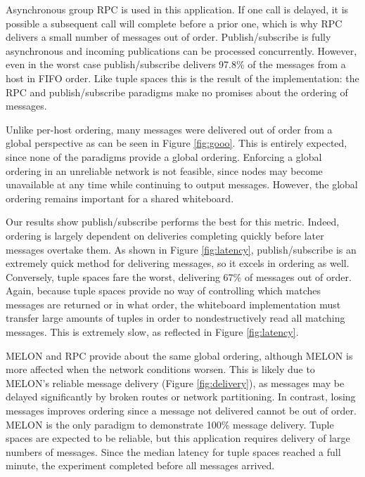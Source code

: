 \documentclass{llncs}
\begin{document}
Asynchronous group RPC is used in this application. If one call is delayed, it is possible a subsequent call will complete before a prior one, which is why RPC delivers a small number of messages out of order. Publish/subscribe is fully asynchronous and incoming publications can be processed concurrently. However, even in the worst case publish/subscribe delivers 97.8\% of the messages from a host in FIFO order. Like tuple spaces this is the result of the implementation: the RPC and publish/subscribe paradigms make no promises about the ordering of messages.

Unlike per-host ordering, many messages were delivered out of order from a global perspective as can be seen in Figure \ref{fig:gooo}. This is entirely expected, since none of the paradigms provide a global ordering. Enforcing a global ordering in an unreliable network is not feasible, since nodes may become unavailable at any time while continuing to output messages. However, the global ordering remains important for a shared whiteboard.

Our results show publish/subscribe performs the best for this metric. Indeed, ordering is largely dependent on deliveries completing quickly before later messages overtake them. As shown in Figure \ref{fig:latency}, publish/subscribe is an extremely quick method for delivering messages, so it excels in ordering as well. Conversely, tuple spaces fare the worst, delivering 67\% of messages out of order. Again, because tuple spaces provide no way of controlling which matches messages are returned or in what order, the whiteboard implementation must transfer large amounts of tuples in order to nondestructively read all matching messages. This is extremely slow, as reflected in Figure \ref{fig:latency}.

MELON and RPC provide about the same global ordering, although MELON is more affected when the network conditions worsen. This is likely due to MELON's reliable message delivery (Figure \ref{fig:delivery}), as messages may be delayed significantly by broken routes or network partitioning. In contrast, losing messages improves ordering since a message not delivered cannot be out of order. MELON is the only paradigm to demonstrate 100\% message delivery. Tuple spaces are expected to be reliable, but this application requires delivery of large numbers of messages. Since the median latency for tuple spaces reached a full minute, the experiment completed before all messages arrived.
\end{document}
